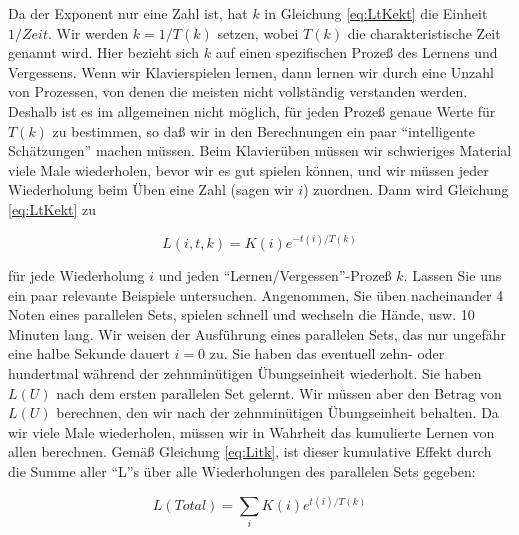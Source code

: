Da der Exponent nur eine Zahl ist, hat $k$ in Gleichung \ref{eq:LtKekt} die Einheit $1/Zeit$.
Wir werden $k = 1/T(k)$ setzen, wobei $T(k)$ die charakteristische Zeit genannt wird.
Hier bezieht sich $k$ auf einen spezifischen Prozeß des Lernens und Vergessens.
Wenn wir Klavierspielen lernen, dann lernen wir durch eine Unzahl von Prozessen, von denen die meisten nicht vollständig verstanden werden.
Deshalb ist es im allgemeinen nicht möglich, für jeden Prozeß genaue Werte für $T(k)$ zu bestimmen, so daß wir in den Berechnungen ein paar \enquote{intelligente Schätzungen} machen müssen.
Beim Klavierüben müssen wir schwieriges Material viele Male wiederholen, bevor wir es gut spielen können, und wir müssen jeder Wiederholung beim Üben eine Zahl (sagen wir $i$) zuordnen.
Dann wird Gleichung \ref{eq:LtKekt} zu

\begin{equation}
\label{eq:Litk}
 L(i,t,k)=K(i)e^{-t(i)/T(k)}
\end{equation}

für jede Wiederholung $i$ und jeden \enquote{Lernen/Vergessen}-Prozeß $k$.
Lassen Sie uns ein paar relevante Beispiele untersuchen.
Angenommen, Sie üben nacheinander 4 Noten eines parallelen Sets, spielen schnell und wechseln die Hände, usw. 10 Minuten lang.
Wir weisen der Ausführung eines parallelen Sets, das nur ungefähr eine halbe Sekunde dauert $i = 0$ zu.
Sie haben das eventuell zehn- oder hundertmal während der zehnminütigen Übungseinheit wiederholt.
Sie haben $L(U)$ nach dem ersten parallelen Set gelernt.
Wir müssen aber den Betrag von $L(U)$ berechnen, den wir nach der zehnminütigen Übungseinheit behalten.
Da wir viele Male wiederholen, müssen wir in Wahrheit das kumulierte Lernen von allen berechnen.
Gemäß Gleichung \ref{eq:Litk}, ist dieser kumulative Effekt durch die Summe aller \enquote{L}s über alle Wiederholungen des parallelen Sets gegeben:

\begin{equation}
\label{eq:sumL}
 L(Total)=\sum_i K(i)e^{t(i)/T(k)}
\end{equation}

